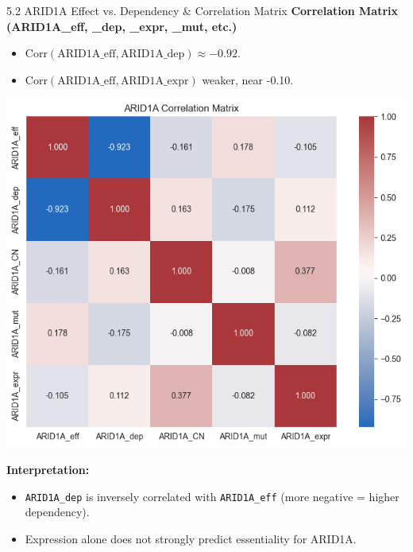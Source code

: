 \documentclass[10pt]{beamer}
\begin{document}
\begin{frame}{5.2 ARID1A Effect vs. Dependency \& Correlation Matrix}
  \textbf{Correlation Matrix (ARID1A\_eff, \_dep, \_expr, \_mut, etc.)}
  \begin{itemize}
    \item \(\mathrm{Corr}(\text{ARID1A\_eff}, \text{ARID1A\_dep}) \approx -0.92\).
    \item \(\mathrm{Corr}(\text{ARID1A\_eff}, \text{ARID1A\_expr})\) weaker, near -0.10.
  \end{itemize}

  \begin{center}
    \includegraphics[width=0.42\linewidth]{figs/arid1a_correlation_matrix.png}
  \end{center}

  \textbf{Interpretation:}  
  \begin{itemize}
    \item \texttt{ARID1A\_dep} is inversely correlated with \texttt{ARID1A\_eff} (more negative = higher dependency).
    \item Expression alone does not strongly predict essentiality for ARID1A.
  \end{itemize}
\end{frame}
\end{document}
